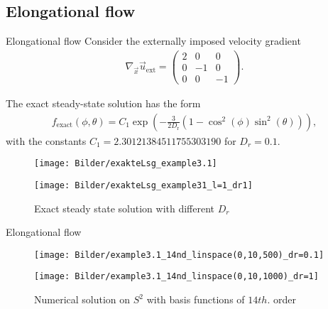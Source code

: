 \subsection{Elongational flow}
\begin{frame}{Elongational flow}
	\scriptsize
Consider the externally imposed velocity gradient
\begin{align*}
	\nabla_{\vec{x}} \vec{u}_{\mathrm{ext}}=\left(\begin{array}{ccc}
		2 & 0 & 0 \\
		0 & -1 & 0 \\
		0 & 0 & -1
	\end{array}\right). %
\end{align*}

The exact steady-state solution has the form
\begin{align}
	f_{\text {exact}}(\phi, \theta)=C_1 \exp \left(-\frac{3}{2 D_{\mathrm{r}}}\left(1-\cos ^2(\phi) \sin ^2(\theta)\right)\right),
\end{align}
with the constants $C_1 = 2.30121384511755303190$ for $D_r=0.1$.

\begin{figure}
	\begin{minipage}{0.4\textwidth}
		\texttt{[image: Bilder/exakteLsg\_example3.1]}
	\end{minipage}
	\hfill 
	\begin{minipage}{0.4\textwidth}
		\texttt{[image: Bilder/exakteLsg\_example31\_l=1\_dr1]}
	\end{minipage}
	\caption{Exact steady state solution with different $D_r$}
\end{figure}

\end{frame}



\begin{frame}{Elongational flow}
\begin{figure}
	\begin{minipage}{0.48\textwidth}
		\texttt{[image: Bilder/example3.1\_14nd\_linspace(0,10,500)\_dr=0.1]}
	\end{minipage}
	\hfill 
	\begin{minipage}{0.48\textwidth}
		\texttt{[image: Bilder/example3.1\_14nd\_linspace(0,10,1000)\_dr=1]}
	\end{minipage}
	\caption{Numerical solution on $S^2$ with basis functions of $14th.$ order}
\end{figure}
\end{frame}

